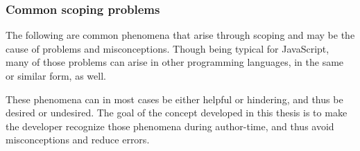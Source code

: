 \subsubsection{Common scoping problems}\label{common-scoping-problems}

The following are common phenomena that arise through scoping and may be
the cause of problems and misconceptions. Though being typical for
JavaScript, many of those problems can arise in other programming
languages, in the same or similar form, as well.

These phenomena can in most cases be either helpful or hindering, and
thus be desired or undesired. The goal of the concept developed in this
thesis is to make the developer recognize those phenomena during
author-time, and thus avoid misconceptions and reduce errors.

